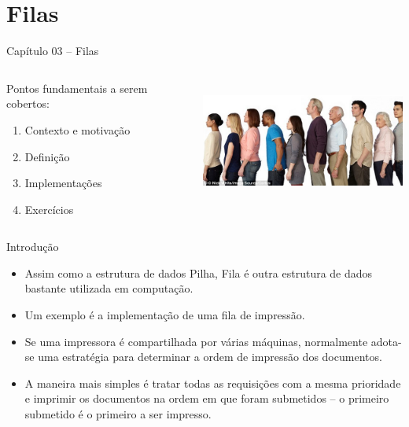 \section{Filas}

\begin{frame}

\begin{center}
{\Large Capítulo 03 -- Filas}
\end{center}

\begin{columns}
\begin{column}{.4\textwidth}
\centering
Pontos fundamentais a serem cobertos:
  \begin{enumerate}
  \item Contexto e motivação
  \item Definição
  \item Implementações
  \item Exercícios 
\end{enumerate}  

\end{column}

\begin{column}{.6\textwidth}
\centering
\includegraphics[height=4cm, width=7cm]{figs/fig_filas/fila_pessoas.jpeg}
\end{column}

\end{columns}


\end{frame}


  \begin{frame}{Introdução}    

		\begin{itemize}
			\item Assim como a estrutura de dados Pilha, Fila é outra estrutura de dados 
			bastante utilizada em computação.
			\item Um exemplo é a implementação de uma fila de impressão.
			\item Se uma impressora é compartilhada por várias máquinas, 
			normalmente adota-se uma estratégia para determinar a ordem de impressão dos documentos.
			\item A maneira mais simples é tratar todas as requisições 
			com a mesma prioridade e imprimir os documentos na ordem em que 
			foram submetidos -- o primeiro submetido é o primeiro a ser impresso.
		\end{itemize}
  \end{frame}

